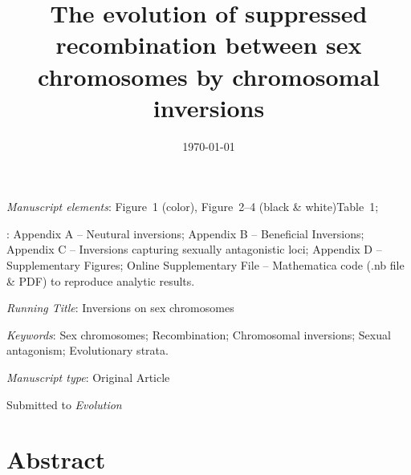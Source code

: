 \documentclass{article}[12pt]
\title{The evolution of suppressed recombination between sex chromosomes by chromosomal inversions}
\date{}
\begin{document}
\maketitle



\bigskip

\noindent \textit{Manuscript elements}: Figure~1 (color), Figure~2--4 (black \& white)Table~1;

: Appendix A -- Neutural inversions; Appendix B -- Beneficial Inversions; Appendix C -- Inversions capturing sexually antagonistic loci; Appendix D -- Supplementary Figures; Online Supplementary File -- Mathematica code (.nb file \& PDF) to reproduce analytic results.

\bigskip
\noindent{} \textit{Running Title}: Inversions on sex chromosomes

\bigskip

\noindent{} \textit{Keywords}: Sex chromosomes; Recombination; Chromosomal inversions; Sexual antagonism; Evolutionary strata.

\bigskip

\noindent{} \textit{Manuscript type}: Original Article

\bigskip

\begin{center} 
	Submitted to {\itshape Evolution} \date{\today}
\end{center}

\linenumbers
\modulolinenumbers[1]
\renewcommand\linenumberfont{\normalfont\small}


\newpage{}
\section*{Abstract}%
\end{document}
